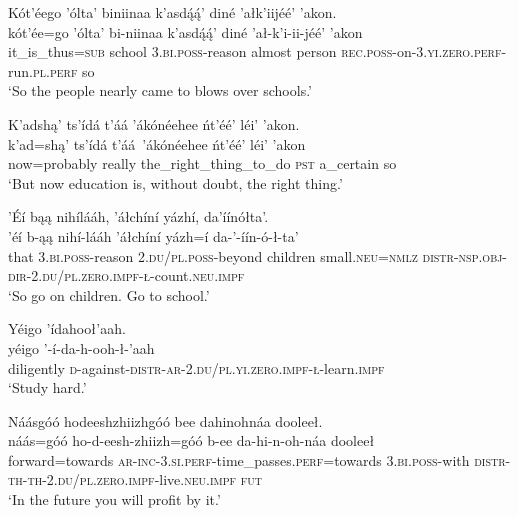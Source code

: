 \ea\label{ex:text3-11-9}
Kót’éego ’ólta’ biniinaa k’asdą́ą́’ diné ’ałk’iijéé’ ’akon.\\
\gll kót’ée=go	’ólta’	bi-niinaa	k’asdą́ą́’	diné	’ał-k’i-ii-jéé’	’akon\\
     it\_is\_thus=\textsc{sub}	school	3.\textsc{bi}.\textsc{poss}-reason	almost	person	\textsc{rec}.\textsc{poss}-on-3.\textsc{yi}.\textsc{zero}.\textsc{perf}-run.\textsc{pl}.\textsc{perf}	so\\
\glt `So the people nearly came to blows over schools.'
\z

\ea\label{ex:text3-11-10}
K’adshą’ ts’ídá t’áá ’ákónéehee ńt’éé’ léi’ ’akon.\\
\gll k’ad=shą’	ts’ídá	t’áá~{’ákónéehee}	ńt’éé’	léi’	’akon\\
     now=probably	really	the\_right\_thing\_to\_do	\textsc{pst}	a\_certain	so\\
\glt `But now education is, without doubt, the right thing.'
\z

\ea\label{ex:text3-11-11}
’Éí bąą nihílááh, ’áłchíní yázhí, da’íínółta’.\\
\gll ’éí	b-ąą	nihí-lááh	’áłchíní	yázh=í	da-’-íín-ó-ł-ta’\\
     that	3.\textsc{bi}.\textsc{poss}-reason	2.\textsc{du}/\textsc{pl}.\textsc{poss}-beyond	children	small.\textsc{neu}=\textsc{nmlz}	\textsc{distr}-\textsc{nsp}.\textsc{obj}-\textsc{dir}-2.\textsc{du}/\textsc{pl}.\textsc{zero}.\textsc{impf}-\textsc{ł}-count.\textsc{neu}.\textsc{impf}\\
\glt `So go on children. Go to school.'
\z

\newpage
\ea\label{ex:text3-11-12}
Yéigo ’ídahooł’aah.\\
\gll yéigo	’-í-da-h-ooh-ł-’aah\\
     diligently	\textsc{d}-against-\textsc{distr}-\textsc{ar}-2.\textsc{du}/\textsc{pl}.\textsc{yi}.\textsc{zero}.\textsc{impf}-\textsc{ł}-learn.\textsc{impf}\\
\glt `Study hard.'
\z

\ea\label{ex:text3-11-13}
Náásgóó hodeeshzhiizhgóó bee dahinohnáa dooleeł.\\
\gll náás=góó	ho-d-eesh-zhiizh=góó	b-ee	da-hi-n-oh-náa	dooleeł\\
     forward=towards	\textsc{ar}-\textsc{inc}-3.\textsc{si}.\textsc{perf}-time\_passes.\textsc{perf}=towards	3.\textsc{bi}.\textsc{poss}-with	\textsc{distr}-\textsc{th}-\textsc{th}-2.\textsc{du}/\textsc{pl}.\textsc{zero}.\textsc{impf}-live.\textsc{neu}.\textsc{impf}	\textsc{fut}\\
\glt `In the future you will profit by it.'
\z
